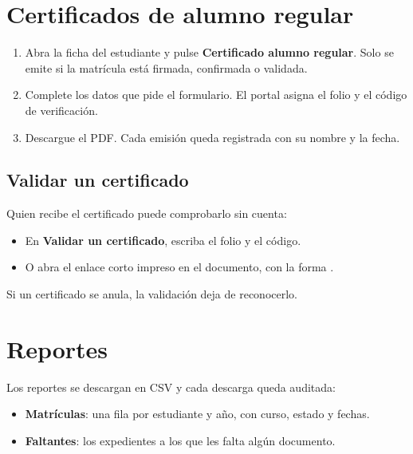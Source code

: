 \section{Certificados de alumno regular}\label{sec:certificados}


\begin{enumerate}[leftmargin=*,itemsep=0.2em]
\item Abra la ficha del estudiante y pulse \textbf{Certificado alumno
  regular}. Solo se emite si la matrícula está firmada, confirmada o validada.
\item Complete los datos que pide el formulario. El portal asigna el folio y
  el código de verificación.
\item Descargue el PDF. Cada emisión queda registrada con su nombre y la
  fecha.
\end{enumerate}

\subsection{Validar un certificado}

Quien recibe el certificado puede comprobarlo sin cuenta:

\begin{itemize}[leftmargin=*,itemsep=0.2em]
\item En \textbf{Validar un certificado}, escriba el folio y el código.
\item O abra el enlace corto impreso en el documento, con la forma
  .
\end{itemize}

Si un certificado se anula, la validación deja de reconocerlo.

\section{Reportes}


Los reportes se descargan en CSV y cada descarga queda auditada:

\begin{itemize}[leftmargin=*,itemsep=0.2em]
\item \textbf{Matrículas}: una fila por estudiante y año, con curso, estado y
  fechas.
\item \textbf{Faltantes}: los expedientes a los que les falta algún
  documento.
\end{itemize}

